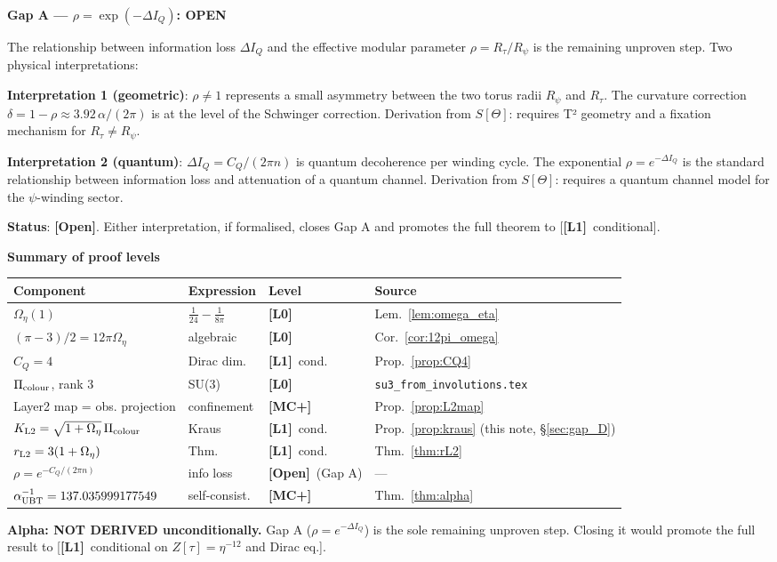 \documentclass[12pt,a4paper]{article}
\theoremstyle{definition}\newtheorem{definition}[theorem]{Definition}
\theoremstyle{remark}\newtheorem{remark}[theorem]{Remark}
\newcommand{\Lz}{\textbf{[L0]}}
\newcommand{\Lo}{\textbf{[L1]}}
\newcommand{\MCp}{\textbf{[MC+]}}
\newcommand{\OPEN}{\textbf{[Open]}}
\begin{document}
\begin{gapbox}
\textbf{Gap A — $\rho = \exp(-\Delta I_Q)$: OPEN}

The relationship between information loss $\Delta I_Q$ and the
effective modular parameter $\rho = R_\tau/R_\psi$ is the remaining
unproven step. Two physical interpretations:

\textbf{Interpretation 1 (geometric)}: $\rho \neq 1$ represents
a small asymmetry between the two torus radii $R_\psi$ and $R_\tau$.
The curvature correction $\delta = 1 - \rho \approx 3.92\,\alpha/(2\pi)$
is at the level of the Schwinger correction. Derivation from $S[\Theta]$:
requires T² geometry and a fixation mechanism for $R_\tau \neq R_\psi$.

\textbf{Interpretation 2 (quantum)}: $\Delta I_Q = C_Q/(2\pi n)$
is quantum decoherence per winding cycle. The exponential
$\rho = e^{-\Delta I_Q}$ is the standard relationship between
information loss and attenuation of a quantum channel.
Derivation from $S[\Theta]$: requires a quantum channel model
for the $\psi$-winding sector.

\textbf{Status}: \OPEN. Either interpretation, if formalised,
closes Gap A and promotes the full theorem to [\Lo\ conditional].
\end{gapbox}

\begin{resultbox}
\textbf{Summary of proof levels}

\begin{center}
\begin{tabular}{llll}
\toprule
Component & Expression & Level & Source \\
\midrule
$\Omega_\eta(1)$ & $\tfrac{1}{24}-\tfrac{1}{8\pi}$ & \Lz & Lem.~\ref{lem:omega_eta} \\
$(\pi-3)/2 = 12\pi\Omega_\eta$ & algebraic & \Lz & Cor.~\ref{cor:12pi_omega} \\
$C_Q = 4$ & Dirac dim. & \Lo\ cond. & Prop.~\ref{prop:CQ4} \\
$\Pi_{\rm colour}$, rank 3 & SU(3) & \Lz & \texttt{su3\_from\_involutions.tex} \\
Layer2 map = obs. projection & confinement & \MCp & Prop.~\ref{prop:L2map} \\
$K_{\rm L2} = \sqrt{1+\Omega_\eta}\,\Pi_{\rm colour}$ & Kraus & \Lo\ cond. & Prop.~\ref{prop:kraus} (this note, \S\ref{sec:gap_D}) \\
$r_{\rm L2} = 3(1+\Omega_\eta)$ & Thm. & \Lo\ cond. & Thm.~\ref{thm:rL2} \\
$\rho = e^{-C_Q/(2\pi n)}$ & info loss & \OPEN\ (Gap A) & — \\
$\alpha^{-1}_{\rm UBT} = 137.035999177549$ & self-consist. & \MCp & Thm.~\ref{thm:alpha} \\
\bottomrule
\end{tabular}
\end{center}

\textbf{Alpha: NOT DERIVED unconditionally.}
Gap A ($\rho = e^{-\Delta I_Q}$) is the sole remaining unproven step.
Closing it would promote the full result to [\Lo\ conditional on
$Z[\tau]=\eta^{-12}$ and Dirac eq.].
\end{resultbox}
\end{document}
